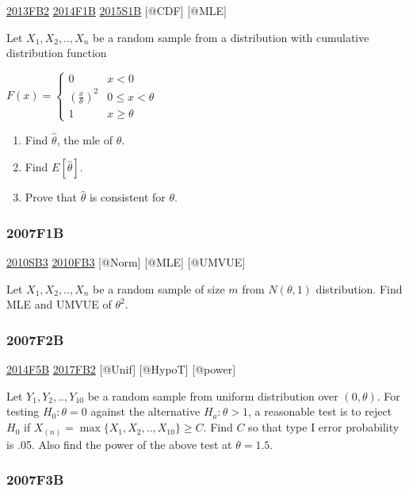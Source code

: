 \documentclass[6pt,twocolumn,Portrait]{article}
\begin{document}
\protect\hyperlink{fb2-2}{2013FB2} \protect\hyperlink{f1b-1}{2014F1B}
\protect\hyperlink{s1b-1}{2015S1B} {[}@CDF{]} {[}@MLE{]}

Let \(X_1,X_2,..,X_n\) be a random sample from a distribution with
cumulative distribution function

\(F(x)=\begin{cases}0&x<0\\(\frac{x}\theta)^2& 0\le x<\theta\\1& x\ge\theta\end{cases}\)

\begin{enumerate}
\def\labelenumi{(\alph{enumi})}
\item
  Find \(\hat\theta\), the mle of \(\theta\).
\item
  Find \(E[\hat\theta]\).
\item
  Prove that \(\hat\theta\) is consistent for \(\theta\).
\end{enumerate}

\hypertarget{f1b}{%
\subsubsection{2007F1B}\label{f1b}}

\protect\hyperlink{sb3-1}{2010SB3} \protect\hyperlink{fb3-1}{2010FB3}
{[}@Norm{]} {[}@MLE{]} {[}@UMVUE{]}

Let \(X_1,X_2,..,X_n\) be a random sample of size \(m\) from
\(N(\theta,1)\) distribution. Find MLE and UMVUE of \(\theta^2\).

\hypertarget{f2b}{%
\subsubsection{2007F2B}\label{f2b}}

\protect\hyperlink{f5b-1}{2014F5B} \protect\hyperlink{fb2-3}{2017FB2}
{[}@Unif{]} {[}@HypoT{]} {[}@power{]}

Let \(Y_1,Y_2,..,Y_{10}\) be a random sample from uniform distribution
over \((0,\theta)\). For testing \(H_0:\theta=0\) against the
alternative \(H_a:\theta>1\), a reasonable test is to reject \(H_0\) if
\(X_{(n)}=\max\{X_1,X_2,..,X_{10}\}\ge C\). Find \(C\) so that type I
error probability is .05. Also find the power of the above test at
\(\theta=1.5\).

\hypertarget{f3b}{%
\subsubsection{2007F3B}\label{f3b}}
\end{document}
